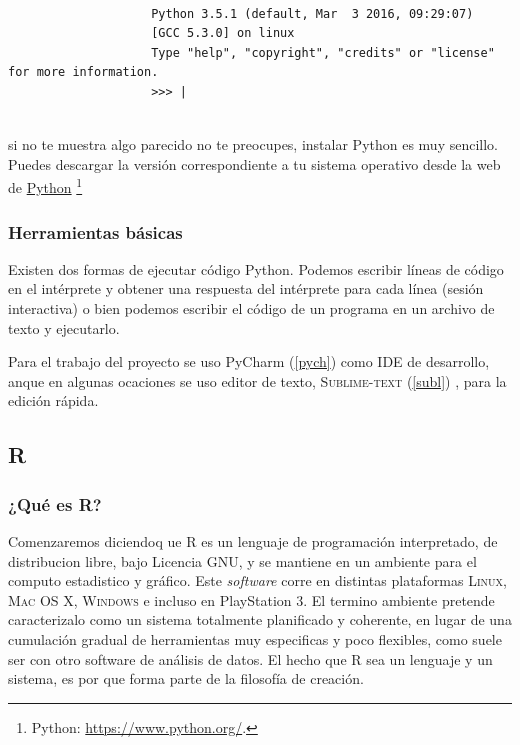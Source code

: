 \documentclass[12pt]{book} %
\begin{document}
			\begin{minipage}[t]{0.3\textwidth}
			\scriptsize			
				\begin{verbatim}

					Python 3.5.1 (default, Mar  3 2016, 09:29:07)
					[GCC 5.3.0] on linux
					Type "help", "copyright", "credits" or "license" for more information.
					>>> |
				\end{verbatim}			
			\end{minipage}
			\\
			si no te muestra algo parecido no te preocupes, instalar Python es muy sencillo. Puedes descargar la versión correspondiente a
			tu sistema operativo desde la web de \href{https://www.python.org/}{Python} 
			\footnote{\scriptsize Python: \href{https://www.python.org/}{https://www.python.org/}.}
			
		\subsubsection{Herramientas básicas}
			Existen dos formas de ejecutar código Python. Podemos escribir líneas de código en el intérprete y obtener una respuesta del
			intérprete para cada línea (sesión interactiva) o bien podemos escribir el código de un programa en un archivo de texto y
			ejecutarlo.
			
			Para el trabajo del proyecto se uso PyCharm (\ref{pych}) como IDE de desarrollo, anque en algunas ocaciones se uso editor de
			texto, \textsc{Sublime-text} (\ref{subl}) , para la edición rápida.

	\subsection{R \label{r}}
		\subsubsection{¿Qué es R?}
			Comenzaremos diciendoq ue \textsf{R}	es un lenguaje de programación interpretado, de distribucion libre, bajo Licencia GNU,
			y se mantiene en un ambiente para el computo estadistico y gráfico. Este \textit{software} corre en distintas plataformas 
			\textsc{Linux, Mac OS X, Windows} e incluso en \textsf{PlayStation 3}. El termino ambiente pretende caracterizalo como un sistema 
			totalmente planificado y coherente, en lugar de una cumulación gradual de herramientas muy especificas y poco flexibles,
			como suele ser con otro software de análisis de datos. El hecho que R sea un lenguaje y un sistema, es por que forma parte de 
			la filosofía de creación.
			
\end{document}
